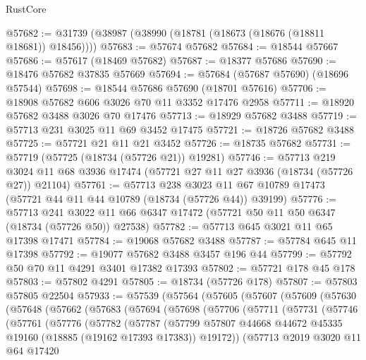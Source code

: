 \begin{lexlean}{RustCore}
\begin{coremodule}
@57682 := @31739 (@38987 (@38990 (@18781 (@18673 (@18676 (@18811 @18681)) @18456))))
@57683 := @57674 @57682
@57684 := @18544 @57667
@57686 := @57617 (@18469 @57682)
@57687 := @18377 @57686
@57690 := @18476 @57682 @37835 @57669
@57694 := @57684 (@57687 @57690) (@18696 @57544)
@57698 := @18544 @57686 @57690 (@18701 @57616)
@57706 := @18908 @57682 @606 @3026 @70 @11 @3352 @17476 @2958
@57711 := @18920 @57682 @3488 @3026 @70 @17476
@57713 := @18929 @57682 @3488
@57719 := @57713 @231 @3025 @11 @69 @3452 @17475
@57721 := @18726 @57682 @3488
@57725 := @57721 @21 @11 @21 @3452
@57726 := @18735 @57682
@57731 := @57719 (@57725 (@18734 (@57726 @21)) @19281)
@57746 := @57713
    @219
    @3024
    @11
    @68
    @3936
    @17474
    (@57721 @27 @11 @27 @3936 (@18734 (@57726 @27)) @21104)
@57761 := @57713
    @238
    @3023
    @11
    @67
    @10789
    @17473
    (@57721 @44 @11 @44 @10789 (@18734 (@57726 @44)) @39199)
@57776 := @57713
    @241
    @3022
    @11
    @66
    @6347
    @17472
    (@57721 @50 @11 @50 @6347 (@18734 (@57726 @50)) @27538)
@57782 := @57713 @645 @3021 @11 @65 @17398 @17471
@57784 := @19068 @57682 @3488
@57787 := @57784 @645 @11 @17398
@57792 := @19077 @57682 @3488 @3457 @196 @44
@57799 := @57792 @50 @70 @11 @4291 @3401 @17382 @17393
@57802 := @57721 @178 @45 @178
@57803 := @57802 @4291
@57805 := @18734 (@57726 @178)
@57807 := @57803 @57805 @22504
@57933 := @57539
    (@57564
      (@57605
        (@57607
          (@57609
            (@57630
              (@57648
                (@57662
                  (@57683
                    (@57694
                      (@57698
                        (@57706
                          (@57711
                            (@57731
                              (@57746
                                (@57761
                                  (@57776
                                    (@57782
                                      (@57787
                                        (@57799
                                          @57807
                                          @44668
                                          @44672
                                          @45335
                                          @19160
                                          (@18885 (@19162 @17393 @17383))
                                          @19172))
                                      (@57713
                                        @2019
                                        @3020
                                        @11
                                        @64
                                        @17420

\end{coremodule}
\end{lexlean}
